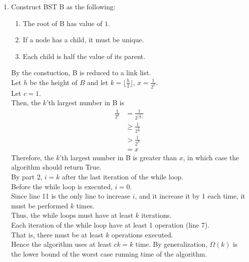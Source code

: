 \documentclass[10pt]{article}
\begin{document}
\begin{enumerate}
\item %
Construct BST B as the following:
\begin{enumerate}
\item The root of B has value of $1$.
\item If a node has a child, it must be unique.
\item Each child is half the value of its parent.
\end{enumerate}

By the constuction, B is reduced to a link list. \\
Let $h$ be the height of $B$ and let $k = \lfloor \frac{h}{2} \rfloor$, $x = \frac{1}{2^h}$. \\
Let $c = 1$. \\ 
Then, the $k$'th largest number in B is 
\begin{align*}
	\frac{1}{2^k} &= \frac{1}{2^{\lfloor \frac{h}{2} \rfloor}} \\
		&\geq \frac{1}{2^\frac{h}{2}} \\
		&> \frac{1}{2^h} \\
		&= x
\end{align*}
Therefore, the $k$'th largest number in B is greater than $x$, in which case the algorithm should return True. \\
By part 2, $i = k$ after the last iteration of the while loop. \\
Before the while loop is executed, $i = 0$. \\
Since line 11 is the only line to increase $i$, and it increase it by 1 each time, it must be performed $k$ times. \\
Thus, the while loops must have at least $k$ iterations. \\
Each iteration of the while loop have at least 1 operation (line 7).\\
That is, there must be at least $k$ operations executed. \\
Hence the algorithm uses at least $ck = k$ time. 
By generalization, $\Omega(k)$ is the lower bound of the worst case running time of the algorithm. 

\end{enumerate}
\end{document}
